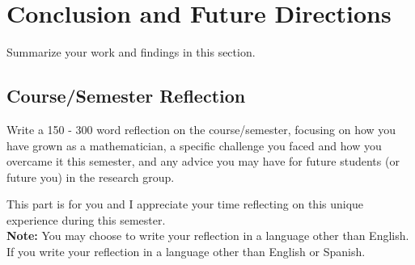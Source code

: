 \section{Conclusion and Future Directions}

Summarize your work and findings in this section.


\subsection{Course/Semester Reflection}

Write a 150 - 300 word reflection on the course/semester, focusing on how you have grown as a mathematician, a specific challenge you faced and how you overcame it this semester,
and any advice you may have for future students (or future you) in the research group.

This part is for you and I appreciate your time reflecting on this unique experience during this semester.\\

{\bf Note:} You may choose to write your reflection in a language other than English. If you write your reflection in a language other than English or Spanish.